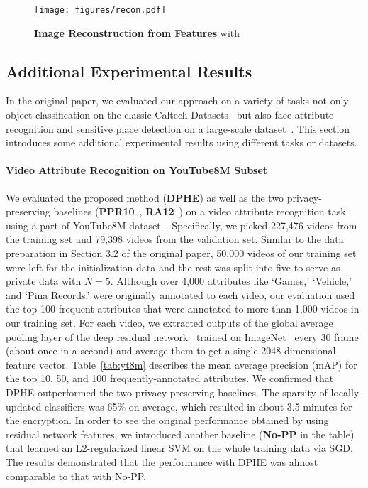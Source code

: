 \documentclass[10pt,twocolumn,letterpaper]{article}
\begin{document}
\begin{figure}[t]
\centering
\texttt{[image: figures/recon.pdf]}
\caption{{\bf Image Reconstruction from Features} with~\cite{Dosovitskiy2016a}}
\label{fig:recon}
\end{figure}

\subsection{Additional Experimental Results}
In the original paper, we evaluated our approach on a variety of tasks not only object classification on the classic Caltech Datasets~\cite{Fei-Fei2007a,Griffin2007a} but also face attribute recognition and sensitive place detection on a large-scale dataset~\cite{Fan2016a,Liu2015a}. This section introduces some additional experimental results using different tasks or datasets.

\paragraph{Video Attribute Recognition on YouTube8M Subset}
We evaluated the proposed method ({\bf DPHE}) as well as the two privacy-preserving baselines ({\bf PPR10}~\cite{Pathak2010a}, {\bf RA12}~\cite{Rajkumar2012a}) on a video attribute recognition task using a part of YouTube8M dataset~\cite{Sami2016}. Specifically, we picked 227,476 videos from the training set and 79,398 videos from the validation set. Similar to the data preparation in Section 3.2 of the original paper, 50,000 videos of our training set were left for the initialization data and the rest was split into five to serve as private data with $N=5$. Although over 4,000 attributes like `Games,' `Vehicle,' and `Pina Records.' were originally annotated to each video, our evaluation used the top 100 frequent attributes that were annotated to more than 1,000 videos in our training set. For each video, we extracted outputs of the global average pooling layer of the deep residual network~\cite{He2016a} trained on ImageNet~\cite{Russakovsky2015a} every 30 frame (about once in a second) and average them to get a single 2048-dimensional feature vector. Table~\ref{tab:yt8m} describes the mean average precision (mAP) for the top 10, 50, and 100 frequently-annotated attributes. We confirmed that DPHE outperformed the two privacy-preserving baselines. The sparsity of locally-updated classifiers was 65\% on average, which resulted in about 3.5 minutes for the encryption.  In order to see the original performance obtained by using residual network features, we introduced another baseline ({\bf No-PP} in the table) that learned an L2-regularized linear SVM on the whole training data via SGD. The results demonstrated that the performance with DPHE was almost comparable to that with No-PP.
\end{document}
